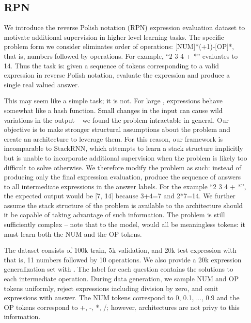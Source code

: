 \documentclass{article}
\begin{document}
\subsection{RPN}
We introduce the reverse Polish notation (RPN) expression evaluation dataset to motivate additional supervision in higher level learning tasks. The specific problem form we consider eliminates order of operations: [NUM]*(+1)-[OP]*, that is,  numbers followed by  operations. For example, ``2 3 4 + *'' evaluates to 14. Thus the task is: given a sequence of tokens corresponding to a valid expression in reverse Polish notation, evaluate the expression and produce a single real valued answer.

This may seem like a simple task; it is not. For large , expressions behave somewhat like a hash function. Small changes in the input can cause wild variations in the output -- we found the problem intractable in general. Our objective is to make stronger structural assumptions about the problem and create an architecture to leverage them. For this reason, our framework is incomparable to StackRNN, which attempts to learn a stack structure implicitly but is unable to incorporate additional supervision when the problem is likely too difficult to solve otherwise. We therefore modify the problem as such: instead of producing only the final expression evaluation, produce the sequence of answers to all  intermediate expressions in the answer labels. For the example ``2 3 4 + *'', the expected output would be [7, 14] because 3+4=7 and 2*7=14. We further assume the stack structure of the problem is available to the architecture should it be capable of taking advantage of such information. The problem is still sufficiently complex -- note that to the model,  would all be meaningless tokens: it must learn both the NUM and the OP tokens. 

The dataset consists of 100k train, 5k validation, and 20k test expression with  -- that is, 11 numbers followed by 10 operations. We also provide a 20k expression generalization set with . The label for each question contains the  solutions to each intermediate operation. During data generation, we sample NUM and OP tokens uniformly, reject expressions including division by zero, and omit expressions with answer. The NUM tokens correspond to 0, 0.1, ..., 0.9 and the OP tokens correspond to +, -, *, /; however, architectures are not privy to this information.
\end{document}
